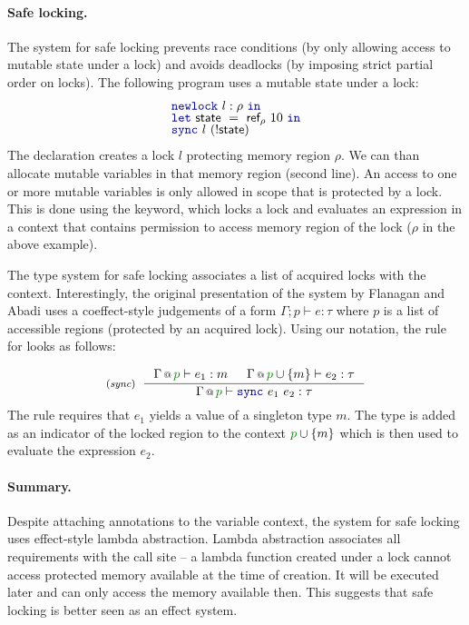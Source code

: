 \paragraph{Safe locking.}
The system for safe locking prevents race conditions (by only allowing access to mutable state 
under a lock) and avoids deadlocks (by imposing strict partial order on locks). The following 
program uses a mutable state under a lock:
%
\begin{equation*}
\begin{array}{l}
\kvd{newlock}~l:\rho~\kvd{in}\\[-0.25em]
\kvd{let}~\ident{state}~=~\ident{ref}_\rho~10~\kvd{in}\\[-0.25em]
\kvd{sync}~l~(!\ident{state})
\end{array}
\end{equation*}
%
The declaration  creates a lock $l$ protecting memory region $\rho$. We can than
allocate mutable variables in that memory region (second line). An access to one or more mutable 
variables is only allowed in scope that is protected by a lock. This is done using the  keyword,
which locks a lock and evaluates an expression in a context that contains permission to access
memory region of the lock ($\rho$ in the above example).

The type system for safe locking associates a list of acquired locks with the context. 
Interestingly, the original presentation of the system by Flanagan and Abadi \cite{app-safe-locking}
uses a coeffect-style judgements of a form $\Gamma; p \vdash e : \tau$ where $p$ is a list of 
accessible regions (protected by an acquired lock). Using our notation, the rule for  
looks as follows:

\begin{equation*}
\tyrule{sync}
  { \coctx{\Gamma}{\cclrd{p}} \vdash e_1 : m& 
    \coctx{\Gamma}{\cclrd{p} \cup \{m\} } \vdash e_2 : \tau }
  { \coctx{\Gamma}{\cclrd{p}} \vdash \kvd{sync}~e_1~e_2 : \tau }
\end{equation*}
%
The rule requires that $e_1$ yields a value of a singleton type $m$. The type is added as an
indicator of the locked region to the context $\cclrd{p}\cup \{m\}$ which is then used to evaluate
the expression $e_2$.

\paragraph{Summary.}
Despite attaching annotations to the variable context, the system for safe locking uses 
effect-style lambda abstraction. Lambda abstraction associates all requirements with the 
call site -- a lambda function created under a lock cannot access protected memory available at 
the time of creation. It will be executed later and can only access the memory available then.
This suggests that safe locking is better seen as an effect system. 

